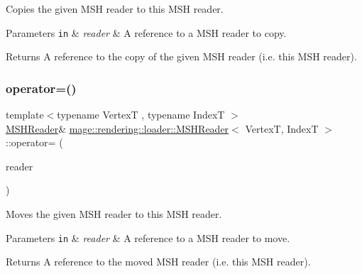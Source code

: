 Copies the given M\+SH reader to this M\+SH reader.


\begin{DoxyParams}[1]{Parameters}
\mbox{\tt in}  & {\em reader} & A reference to a M\+SH reader to copy. \\
\hline
\end{DoxyParams}
\begin{DoxyReturn}{Returns}
A reference to the copy of the given M\+SH reader (i.\+e. this M\+SH reader). 
\end{DoxyReturn}
\mbox{\label{classmage_1_1rendering_1_1loader_1_1_m_s_h_reader_a8764164f7e0f78938c5e303d13e0f64d}} 
\subsubsection{\texorpdfstring{operator=()}{operator=()}\hspace{0.1cm}{\footnotesize\ttfamily [2/2]}}
{\footnotesize\ttfamily template$<$typename VertexT , typename IndexT $>$ \\
\mbox{\hyperlink{classmage_1_1rendering_1_1loader_1_1_m_s_h_reader}{M\+S\+H\+Reader}}\& \mbox{\hyperlink{classmage_1_1rendering_1_1loader_1_1_m_s_h_reader}{mage\+::rendering\+::loader\+::\+M\+S\+H\+Reader}}$<$ VertexT, IndexT $>$\+::operator= (\begin{DoxyParamCaption}\item[{\mbox{\hyperlink{classmage_1_1rendering_1_1loader_1_1_m_s_h_reader}{M\+S\+H\+Reader}}$<$ VertexT, IndexT $>$ \&\&}]{reader }\end{DoxyParamCaption})\hspace{0.3cm}{\ttfamily [delete]}}

Moves the given M\+SH reader to this M\+SH reader.


\begin{DoxyParams}[1]{Parameters}
\mbox{\tt in}  & {\em reader} & A reference to a M\+SH reader to move. \\
\hline
\end{DoxyParams}
\begin{DoxyReturn}{Returns}
A reference to the moved M\+SH reader (i.\+e. this M\+SH reader). 
\end{DoxyReturn}
\mbox{\label{classmage_1_1rendering_1_1loader_1_1_m_s_h_reader_a99e8e3c50decb9332dc10bcdf7b6e00a}} 
